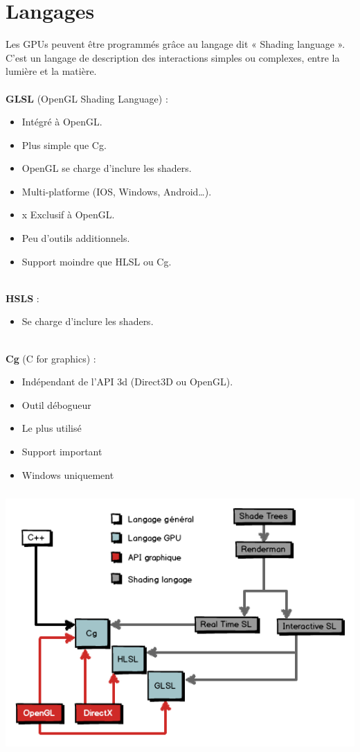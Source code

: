 \section{Langages}
Les GPUs peuvent être programmés grâce au langage dit « Shading language ». C’est un langage de description des interactions simples ou complexes, entre la lumière et la matière.\\
\textbf{\\GLSL} (OpenGL Shading Language) : 
\begin{itemize}
	\item Intégré à OpenGL.
	\item Plus simple que Cg.
	\item OpenGL se charge d’inclure les shaders.
	\item Multi-platforme (IOS, Windows, Android…).
	\item{x} Exclusif à OpenGL.
	\item Peu d’outils additionnels.
	\item Support moindre que HLSL ou Cg.
\end{itemize}
\textbf{\\HSLS} :
\begin{itemize}
	\item Se charge d’inclure les shaders.
\end{itemize}
\textbf{\\Cg} (C for graphics) : 
\begin{itemize}
	\item Indépendant de l’API 3d (Direct3D ou OpenGL).
	\item Outil débogueur
	\item Le plus utilisé
	\item Support important
	\item Windows uniquement
\end{itemize}
\begin{center}
\includegraphics[width=14cm,height=100mm]{leo/images/langages.png}
\end{center}